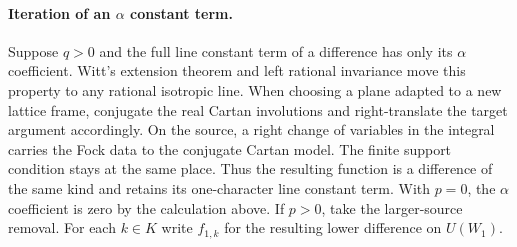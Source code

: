 \paragraph{Iteration of an \(\alpha\) constant term.}
Suppose \(q>0\) and the full line constant term of a difference
has only its \(\alpha\) coefficient. Witt's extension theorem and
left rational invariance move this property to any rational isotropic
line. When choosing a plane adapted to a new lattice frame, conjugate
the real Cartan involutions and right-translate the target argument
accordingly. On the source, a right change of variables in the
integral carries the Fock data to the conjugate Cartan model. The
finite support condition stays at the same place. Thus the resulting
function is a difference of the same kind and retains its one-character
line constant term. With \(p=0\), the \(\alpha\) coefficient is zero
by the calculation above. If \(p>0\), take the larger-source removal.
For each \(k\in K\) write \(f_{1,k}\) for the resulting lower
difference on \(U(W_1)\).

